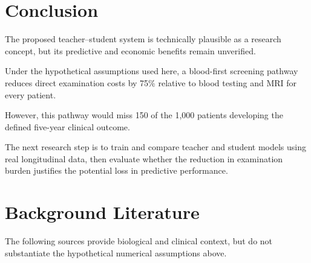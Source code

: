 \documentclass[11pt,a4paper]{article}
\begin{document}
\section{Conclusion}

The proposed teacher--student system is
technically plausible as a research concept,
but its predictive and economic benefits
remain unverified.

Under the hypothetical assumptions used here,
a blood-first screening pathway reduces
direct examination costs by 75\% relative to
blood testing and MRI for every patient.

However, this pathway would miss 150 of the
1,000 patients developing the defined
five-year clinical outcome.

\noindent{}

\vspace{4mm}

The next research step is to train and compare
teacher and student models using real longitudinal
data, then evaluate whether the reduction in
examination burden justifies the potential
loss in predictive performance.

\section*{Background Literature}

The following sources provide biological
and clinical context, but do not substantiate
the hypothetical numerical assumptions above.
\end{document}
